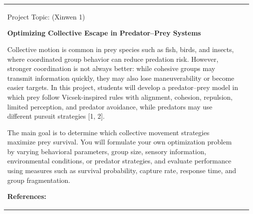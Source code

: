 \documentclass[a4paper,landscape]{article}
\newlength{\HeaderSize}
\newlength{\HeaderSizeBaseline}
\newlength{\SectionSize}
\newlength{\SectionSizeBaseline}
\newlength{\TextSize}
\newlength{\TextSizeBaseline}
\newlength{\vskipHeader}
\newlength{\vskipSection}
\newlength{\vskipText}
\newlength{\LeftPanel}
\newlength{\PanelGap}
\newlength{\RightPanel}
\begin{document}
\noindent
\begin{tabular}{@{}p{\LeftPanel}@{\hspace{\PanelGap}}p{\RightPanel}@{}}

\parbox[t][\LeftPanel][t]{\LeftPanel}{%

\begin{center}
  {\fontsize{\HeaderSize}{\HeaderSizeBaseline}\selectfont\color{topicblue}%
   Project Topic:\hspace{9mm} (Xinwen 1)} 
\end{center}

\vspace{\vskipHeader}

{\fontsize{\SectionSize}{\SectionSizeBaseline}\selectfont\bfseries 
%
Optimizing Collective Escape in Predator–Prey Systems
\par}
\vspace{\vskipSection}

{\fontsize{\TextSize}{\TextSizeBaseline}\selectfont
%
Collective motion is common in prey species such as fish, birds, and insects, where coordinated group behavior can reduce predation risk. However, stronger coordination is not always better: while cohesive groups may transmit information quickly, they may also lose maneuverability or become easier targets. In this project, students will develop a predator–prey model in which prey follow Vicsek-inspired rules with alignment, cohesion, repulsion, limited perception, and predator avoidance, while predators may use different pursuit strategies [1, 2].
\par

\vspace{\vskipText}
The main goal is to determine which collective movement strategies maximize prey survival. You will formulate your own optimization problem by varying behavioral parameters, group size, sensory information, environmental conditions, or predator strategies, and evaluate performance using measures such as survival probability, capture rate, response time, and group fragmentation. 
\par
}

\vfill

{\fontsize{\SectionSize}{\SectionSizeBaseline}\selectfont\bfseries References:\par}
\vspace{\vskipSection}

}
\end{tabular}
\end{document}
